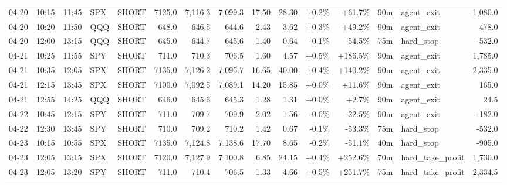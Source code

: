 \documentclass[11pt,a4paper,twoside]{article}
\begin{document}
\begin{landscape}
\begin{center}
\begin{longtable}{>{\color{txtmain}}l l l l l r r r r r r r r >{\color{txtmain}}l r}
04-20 & 10:15 & 11:45 & SPX & SHORT & 7125.0 & 7,116.3 & 7,099.3 & 17.50 & 28.30 & \textcolor{wingreen}{+0.2\%} & \textcolor{wingreen}{+61.7\%} & 90m & agent\_exit & \textcolor{wingreen}{1,080.0} \\
04-20 & 10:20 & 11:50 & QQQ & SHORT & 648.0 & 646.5 & 644.6 & 2.43 & 3.62 & \textcolor{wingreen}{+0.3\%} & \textcolor{wingreen}{+49.2\%} & 90m & agent\_exit & \textcolor{wingreen}{478.0} \\
04-20 & 12:00 & 13:15 & QQQ & SHORT & 645.0 & 644.7 & 645.6 & 1.40 & 0.64 & \textcolor{lossred}{-0.1\%} & \textcolor{lossred}{-54.5\%} & 75m & hard\_stop & \textcolor{lossred}{-532.0} \\
04-21 & 10:25 & 11:55 & SPY & SHORT & 711.0 & 710.3 & 706.5 & 1.60 & 4.57 & \textcolor{wingreen}{+0.5\%} & \textcolor{wingreen}{+186.5\%} & 90m & agent\_exit & \textcolor{wingreen}{1,785.0} \\
04-21 & 10:35 & 12:05 & SPX & SHORT & 7135.0 & 7,126.2 & 7,095.7 & 16.65 & 40.00 & \textcolor{wingreen}{+0.4\%} & \textcolor{wingreen}{+140.2\%} & 90m & agent\_exit & \textcolor{wingreen}{2,335.0} \\
04-21 & 12:15 & 13:45 & SPX & SHORT & 7100.0 & 7,092.5 & 7,089.1 & 14.20 & 15.85 & \textcolor{wingreen}{+0.0\%} & \textcolor{wingreen}{+11.6\%} & 90m & agent\_exit & \textcolor{wingreen}{165.0} \\
04-21 & 12:55 & 14:25 & QQQ & SHORT & 646.0 & 645.6 & 645.3 & 1.28 & 1.31 & \textcolor{wingreen}{+0.0\%} & \textcolor{wingreen}{+2.7\%} & 90m & agent\_exit & \textcolor{wingreen}{24.5} \\
04-22 & 10:45 & 12:15 & SPY & SHORT & 711.0 & 709.7 & 709.9 & 2.02 & 1.56 & \textcolor{lossred}{-0.0\%} & \textcolor{lossred}{-22.5\%} & 90m & agent\_exit & \textcolor{lossred}{-182.0} \\
04-22 & 12:30 & 13:45 & SPY & SHORT & 710.0 & 709.2 & 710.2 & 1.42 & 0.67 & \textcolor{lossred}{-0.1\%} & \textcolor{lossred}{-53.3\%} & 75m & hard\_stop & \textcolor{lossred}{-532.0} \\
04-23 & 10:15 & 10:55 & SPX & SHORT & 7135.0 & 7,124.8 & 7,138.6 & 17.70 & 8.65 & \textcolor{lossred}{-0.2\%} & \textcolor{lossred}{-51.1\%} & 40m & hard\_stop & \textcolor{lossred}{-905.0} \\
04-23 & 12:05 & 13:15 & SPX & SHORT & 7120.0 & 7,127.9 & 7,100.8 & 6.85 & 24.15 & \textcolor{wingreen}{+0.4\%} & \textcolor{wingreen}{+252.6\%} & 70m & hard\_take\_profit & \textcolor{wingreen}{1,730.0} \\
04-23 & 12:05 & 13:20 & SPY & SHORT & 711.0 & 710.4 & 706.5 & 1.33 & 4.66 & \textcolor{wingreen}{+0.5\%} & \textcolor{wingreen}{+251.7\%} & 75m & hard\_take\_profit & \textcolor{wingreen}{2,334.5} \\

\end{longtable}
\end{center}
\end{landscape}
\end{document}
